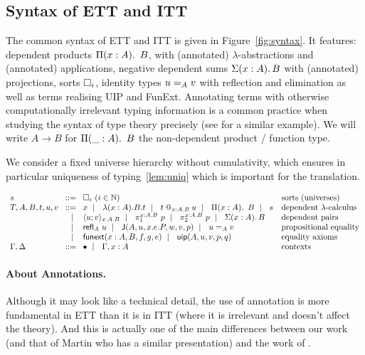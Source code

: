 \subsection{Syntax of ETT and ITT}
\label{sec:ettsyntax}

The common syntax of ETT and ITT is given in Figure~\ref{fig:syntax}.
%
It features: dependent products $\Prod{x:A} B$, with (annotated)
$\lambda$-abstractions and (annotated) applications, negative dependent sums
$\Sum{x:A} B$ with (annotated) projections, sorts $\Ty{i}$, identity types
$\Eq{A}{u}{v}$ with reflection and elimination as well as terms
realising UIP and FunExt. Annotating terms with
otherwise computationally irrelevant typing information is a common
practice when studying the syntax of type theory precisely (see
\cite{streicher1993investigations} for a similar example).
%
We will write $A \to B$ for $\Prod{\_:A} B$ the non-dependent product /
function type.

We consider a fixed universe hierarchy without cumulativity, which
ensures in particular uniqueness of typing~\eqref{lem:uniq} which is
important for the translation.

\begin{figure*}
  \hrulefill
  \[
  \begin{array}{l@{~\,}r@{~\,}l@{\quad}l}
    s &\bnf& \Ty{i} ~(i \in \mathbb{N}) &\mbox{sorts (universes)} \\
    T,A,B,t,u,v &\bnf& x \bnfor \lam{x:A}{B} t \bnfor \app{t}{x:A}{B}{u}
    \bnfor \Prod{x:A} B \bnfor s
    &\mbox{dependent $\lambda$-calculus} \\
    &\bnfor& \pair{x:A}{B}{u}{v} \bnfor \pio{x:A}{B}{p} \bnfor \pit{x:A}{B}{p}
    \bnfor \Sum{x:A} B
    &\mbox{dependent pairs} \\
    &\bnfor& \refl{A} u \bnfor \J{A}{u}{x.e.P}{w}{v}{p} \bnfor \Eq{A}{u}{v}
    &\mbox{propositional equality} \\
    &\bnfor& \funext{x:A}{B}{f}{g}{e} \bnfor \uip{A}{u}{v}{p}{q}
    &\mbox{equality axioms} \\
    \Ga, \D &\bnf& \ctxempty \bnfor \Ga, x:A &\mbox{contexts}
  \end{array}
  \]
  \hrulefill
  \vspace{-2ex}
  \caption{Common syntax of ETT and ITT}
  \label{fig:syntax}
\end{figure*}

\paragraph{About Annotations.}
Although it may look like a technical detail, the use of annotation is more
fundamental in ETT than it is in ITT (where it is irrelevant and doesn't affect
the theory). And this is actually one of the main differences between our work
(and that of Martin \cite{hofmann1995conservativity} who has a similar
presentation) and the work of \cite{oury2005extensionality}.

